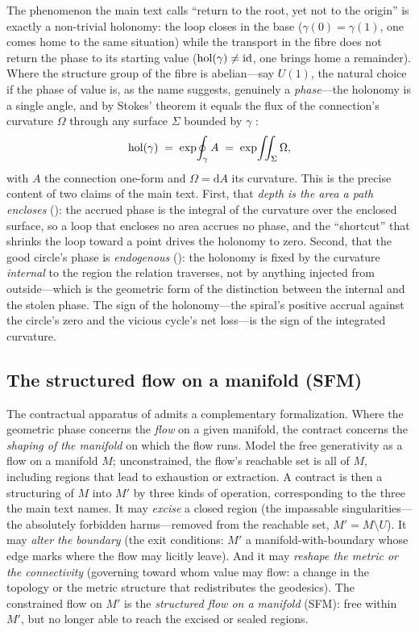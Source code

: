 The phenomenon the main text calls ``return to the root, yet not to the origin'' is exactly a non-trivial holonomy: the loop closes in the base ($\gamma(0)=\gamma(1)$, one comes home to the same situation) while the transport in the fibre does not return the phase to its starting value ($\operatorname{hol}(\gamma)\neq \mathrm{id}$, one brings home a remainder). Where the structure group of the fibre is abelian---say $U(1)$, the natural choice if the phase of value is, as the name suggests, genuinely a \emph{phase}---the holonomy is a single angle, and by Stokes' theorem it equals the flux of the connection's curvature $\Omega$ through any surface $\Sigma$ bounded by $\gamma$ \parencite{berry1984,aharonov1987}:
\[
  \operatorname{hol}(\gamma) \;=\; \exp\!\oint_{\gamma} A \;=\; \exp\!\iint_{\Sigma}\Omega ,
\]
with $A$ the connection one-form and $\Omega = \mathrm{d}A$ its curvature. This is the precise content of two claims of the main text. First, that \emph{depth is the area a path encloses} (): the accrued phase is the integral of the curvature over the enclosed surface, so a loop that encloses no area accrues no phase, and the ``shortcut'' that shrinks the loop toward a point drives the holonomy to zero. Second, that the good circle's phase is \emph{endogenous} (): the holonomy is fixed by the curvature \emph{internal} to the region the relation traverses, not by anything injected from outside---which is the geometric form of the distinction between the internal and the stolen phase. The sign of the holonomy---the spiral's positive accrual against the circle's zero and the vicious cycle's net loss---is the sign of the integrated curvature.

\subsection{The structured flow on a manifold (SFM)}
\label{p09:sec:app-sfm}

The contractual apparatus of  admits a complementary formalization. Where the geometric phase concerns the \emph{flow} on a given manifold, the contract concerns the \emph{shaping of the manifold} on which the flow runs. Model the free generativity as a flow on a manifold $M$; unconstrained, the flow's reachable set is all of $M$, including regions that lead to exhaustion or extraction. A contract is then a structuring of $M$ into $M'$ by three kinds of operation, corresponding to the three the main text names. It may \emph{excise} a closed region (the impassable singularities---the absolutely forbidden harms---removed from the reachable set, $M' = M \setminus U$). It may \emph{alter the boundary} (the exit conditions: $M'$ a manifold-with-boundary whose edge marks where the flow may licitly leave). And it may \emph{reshape the metric or the connectivity} (governing toward whom value may flow: a change in the topology or the metric structure that redistributes the geodesics). The constrained flow on $M'$ is the \emph{structured flow on a manifold} (SFM): free within $M'$, but no longer able to reach the excised or sealed regions.

